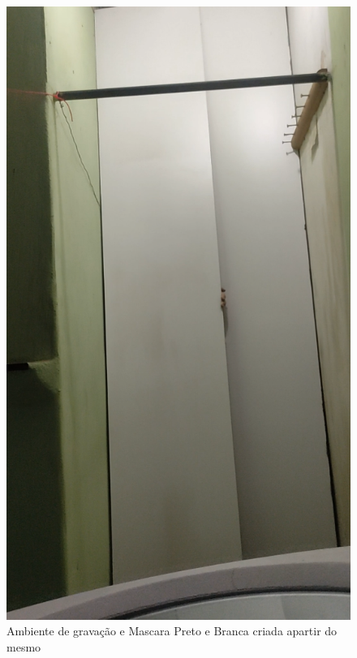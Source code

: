 \begin{figure}[htb]
    \centering
    \caption{Ambiente de gravação e Mascara Preto e Branca criada apartir do mesmo}
        \begin{minipage}{0.4\textwidth}
            \includegraphics[width=\textwidth]{figuras/filter/mask/ambiente.png}
        \end{minipage}
        \begin{minipage}{0.4\textwidth}

\end{minipage}
\end{figure}
